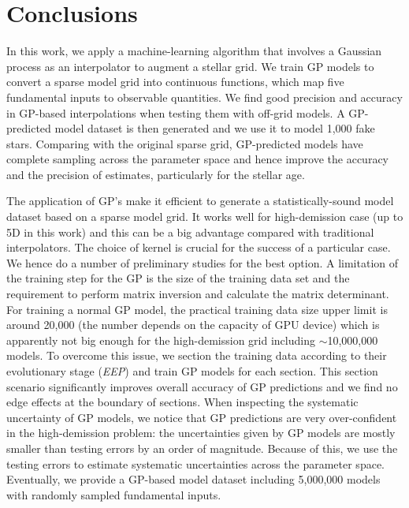 \section{Conclusions}\label{sec:conclusion}

In this work, we apply a machine-learning algorithm that involves a Gaussian process as an interpolator to augment a stellar grid. We train GP models to convert a sparse model grid into continuous functions, which map five fundamental inputs to observable quantities. We find good precision and accuracy in GP-based interpolations when testing them with off-grid models. A GP-predicted model dataset is then generated and we use it to model 1,000 fake stars. Comparing with the original sparse grid, GP-predicted models have complete sampling across the parameter space and hence improve the accuracy and the precision of estimates, particularly for the stellar age.

The application of GP's make it efficient to generate a statistically-sound model dataset based on a sparse model grid. It works well for high-demission case (up to 5D in this work) and this can be a big advantage compared with traditional interpolators. The choice of kernel is crucial for the success of a particular case. We hence do a number of preliminary studies for the best option. A limitation of the training step for the GP is the size of the training data set and the requirement to perform matrix inversion and calculate the matrix determinant. For training a normal GP model, the practical training data size upper limit is around 20,000 (the number depends on the capacity of GPU device) which is apparently not big enough for the high-demission grid including $\sim$10,000,000 models. To overcome this issue, we section the training data according to their evolutionary stage ({\it EEP}) and train GP models for each section. This section scenario significantly improves overall accuracy of GP predictions and we find no edge effects at the boundary of sections. When inspecting the systematic uncertainty of GP models, we notice that GP predictions are very over-confident in the high-demission problem: the uncertainties given by GP models are mostly smaller than testing errors by an order of magnitude. Because of this,  we use the testing errors to estimate systematic uncertainties across the parameter space. Eventually, we provide a GP-based model dataset including 5,000,000 models with randomly sampled fundamental inputs.


